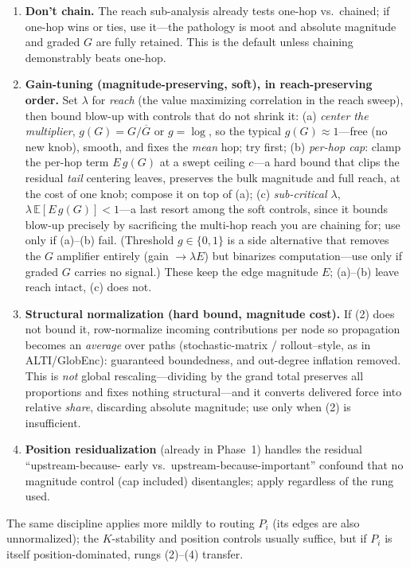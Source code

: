 \documentclass[11pt]{article}
\begin{document}
\begin{enumerate}[leftmargin=1.6em,itemsep=2pt]
\item \textbf{Don't chain.} The reach sub-analysis already tests one-hop vs.\ chained; if one-hop wins
or ties, use it---the pathology is moot and absolute magnitude and graded $G$ are fully retained. This
is the default unless chaining demonstrably beats one-hop.
\item \textbf{Gain-tuning (magnitude-preserving, soft), in reach-preserving order.} Set $\lambda$ for
\emph{reach} (the value maximizing correlation in the reach sweep), then bound blow-up with controls
that do not shrink it:
(a) \emph{center the multiplier}, $g(G){=}G/\overline{G}$ or $g{=}\log$, so the typical
$g(G)\!\approx\!1$---free (no new knob), smooth, and fixes the \emph{mean} hop; try first;
(b) \emph{per-hop cap}: clamp the per-hop term $E\,g(G)$ at a swept ceiling $c$---a hard bound that
clips the residual \emph{tail} centering leaves, preserves the bulk magnitude and full reach, at the
cost of one knob; compose it on top of (a);
(c) \emph{sub-critical $\lambda$}, $\lambda\,\mathbb E[E\,g(G)]<1$---a last resort among the soft
controls, since it bounds blow-up precisely by sacrificing the multi-hop reach you are chaining for;
use only if (a)--(b) fail.
(Threshold $g\in\{0,1\}$ is a side alternative that removes the $G$ amplifier entirely (gain
$\to\lambda E$) but binarizes computation---use only if graded $G$ carries no signal.) These keep the
edge magnitude $E$; (a)--(b) leave reach intact, (c) does not.
\item \textbf{Structural normalization (hard bound, magnitude cost).} If (2) does not bound it,
row-normalize incoming contributions per node so propagation becomes an \emph{average} over paths
(stochastic-matrix / rollout--style, as in ALTI/GlobEnc): guaranteed boundedness, and out-degree
inflation removed. This is \emph{not} global rescaling---dividing by the grand total preserves all
proportions and fixes nothing structural---and it converts delivered force into relative \emph{share},
discarding absolute magnitude; use only when (2) is insufficient.
\item \textbf{Position residualization} (already in Phase~1) handles the residual ``upstream-because-
early vs.\ upstream-because-important'' confound that no magnitude control (cap included) disentangles;
apply regardless of the rung used.
\end{enumerate}
The same discipline applies more mildly to routing $P_i$ (its edges are also unnormalized); the
$K$-stability and position controls usually suffice, but if $P_i$ is itself position-dominated,
rungs (2)--(4) transfer.
\end{document}
